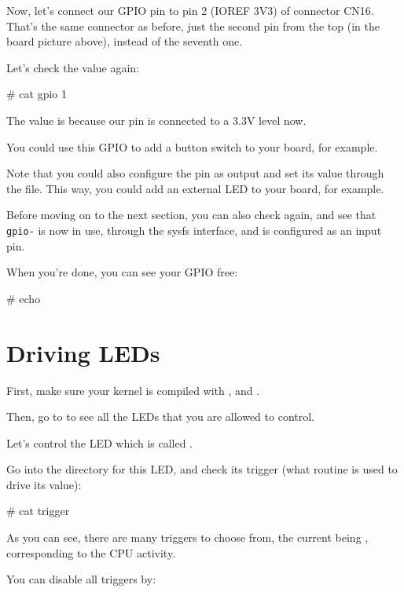 {Now, let's connect our GPIO pin to pin 2 (IOREF 3V3) of connector CN16.
That's the same connector as before, just the second pin from the top
(in the board picture above), instead of the seventh one.

Let's check the value again:

\begin{bashinput}
# cat gpio%
1
\end{bashinput}

The value is  because our pin is connected to a 3.3V level now.

You could use this GPIO to add a button switch to your board, for
example.

Note that you could also configure the pin as output and set its value
through the  file. This way, you could add an external LED
to your board, for example.

Before moving on to the next section, you can also check
 again, and see that {\tt gpio-\gpionum} is now
in use, through the sysfs interface, and is configured as an input pin.

When you're done, you can see your GPIO free:

\begin{bashinput}
# echo %
\end{bashinput}

\section{Driving LEDs}

First, make sure your kernel is compiled with
, 
and .

Then, go to  to see all the LEDs that you are allowed
to control.

Let's control the LED which is called
.

Go into the directory for this LED, and check its trigger (what
routine is used to drive its value):

\begin{bashinput}
# cat trigger
\end{bashinput}

As you can see, there are many triggers to choose from, the current
being , corresponding to the CPU activity.

You can disable all triggers by:

}
